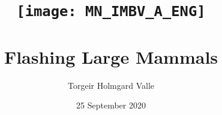 \title{
	{\texttt{[image: MN\_IMBV\_A\_ENG]}}\\
	{~}\\
	{\large Flashing Large Mammals}\\
}
\author{Torgeir Holmgard Valle}
\date{25 September 2020}